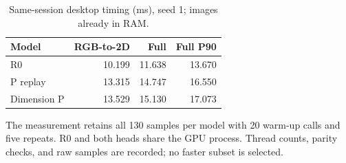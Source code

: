 \begin{table}[t]\centering
\caption{Same-session desktop timing (ms), seed 1; images already in RAM.}
\begin{tabular}{lrrr}\toprule
Model & RGB-to-2D & Full & Full P90 \\ \midrule
R0 & 10.199 & 11.638 & 13.670 \\
P replay & 13.315 & 14.747 & 16.550 \\
Dimension P & 13.529 & 15.130 & 17.073 \\
\bottomrule\end{tabular}
\end{table}
The measurement retains all 130 samples per model with 20 warm-up calls and five repeats. R0 and both heads share the GPU process. Thread counts, parity checks, and raw samples are recorded; no faster subset is selected.
